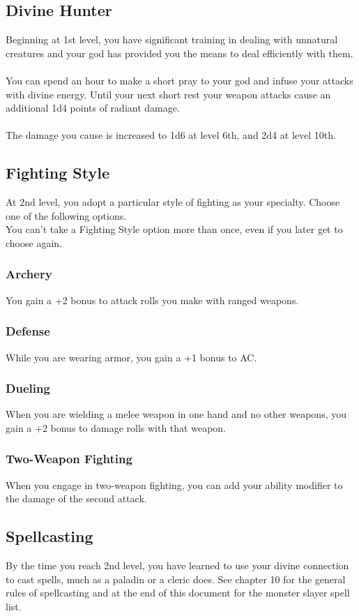 \documentclass[11pt,a4paper,twocolumn]{article}
\begin{document}
	\subsection*{Divine Hunter}
	Beginning at 1st level, you have significant training in dealing with unnatural creatures and your god has provided you the means to deal efficiently with them. \\ \\
	You can spend an hour to make a short pray to your god and infuse your attacks with divine energy. Until your next short rest your weapon attacks cause an additional 1d4 points of radiant damage. \\ \\
	The damage you cause is increased to 1d6 at level 6th, and 2d4 at level 10th.
	
	\subsection*{Fighting Style}
	At 2nd level, you adopt a particular style of fighting as your specialty. Choose one of the following options. \\
	You can’t take a Fighting Style option more than once, even if you later get to choose again.
	
	\subsubsection*{Archery}
	You gain a +2 bonus to attack rolls you make with ranged weapons.
	\subsubsection*{Defense}
	While you are wearing armor, you gain a +1 bonus to AC.
	\subsubsection*{Dueling}
	When you are wielding a melee weapon in one hand and no other weapons, you gain a +2 bonus to damage rolls with that weapon.
	\subsubsection*{Two-Weapon Fighting}
	When you engage in two-weapon fighting, you can add your ability modifier to the damage of the second attack.
	
	\subsection*{Spellcasting}
	By the time you reach 2nd level, you have learned to use your divine connection to cast spells, much as a paladin or a cleric does. See chapter 10 for the general rules of spellcasting and at the end of this document for the monster slayer spell list.
\end{document}
